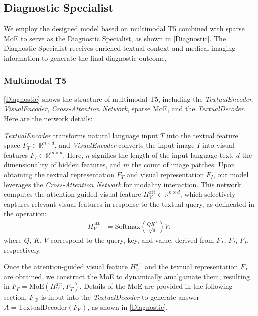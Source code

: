 \documentclass[11pt]{article}
\begin{document}
\subsection{Diagnostic Specialist}
We employ the designed model based on multimodal T5 combined with sparse MoE to serve as the Diagnostic Specialist, as shown in \autoref{Diagnostic}. The Diagnostic Specialist receives enriched textual context and medical imaging information to generate the final diagnostic outcome.
\subsubsection{Multimodal T5}
\autoref{Diagnostic} shows the structure of multimodal T5, including the \textit{TextualEncoder}, \textit{VisualEncoder}, \textit{Cross-Attention Network}, sparse MoE, and the \textit{TextualDecoder}. Here are the network details:

\textit{TextualEncoder} transforms natural language input \( {T} \) into the textual feature space \( F_T \in \mathbb{R}^{n \times d} \), and \textit{VisualEncoder} converts the input image \( I \) into visual features \( F_I \in \mathbb{R}^{m \times d} \). 
Here, \( n \) signifies the length of the input language text, \( d \) the dimensionality of hidden features, and \( m \) the count of image patches.
Upon obtaining the textual representation \( F_T \) and visual representation \( F_I \), our model leverages the \textit{Cross-Attention Network} for modality interaction. This network computes the attention-guided visual feature \( H_{V}^{\text{att}} \in \mathbb{R}^{n \times d} \), which selectively captures relevant visual features in response to the textual query, as delineated in the operation:
\begin{align}
        H_{V}^{\text{att}} &= \text{Softmax}\left(\frac{QK^{\top}}{\sqrt{d}}\right)V,
\end{align}
where $Q$, $K$, $V$ correspond to the query, key, and value, derived from $F_T$, $F_I$, $F_I$, respectively.

Once the attention-guided visual feature \( H_{V}^{\text{att}} \) and the textual representation \( F_T \) are obtained, we construct the MoE to dynamically amalgamate them, resulting in \( F_F = \text{MoE} (H_{V}^{\text{att}}, F_T) \). Details of the MoE are provided in the following section.
$F_{\text{ F}}$ is input into the \textit{TextualDecoder} to generate answer
$A = \text{TextualDecoder}(F_{\text{F}})$, as shown in \autoref{Diagnostic}. 
\end{document}
